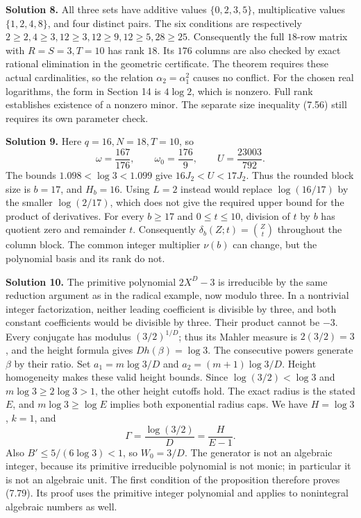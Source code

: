 \documentclass[
  11pt,
  a4paper,
]{article}
\begin{document}
\textbf{Solution 8.} All three sets have additive values
\(\{0,2,3,5\}\), multiplicative values \(\{1,2,4,8\}\), and four
distinct pairs. The six conditions are respectively
\(2\ge2,4\ge3,12\ge3,12\ge9,12\ge5,28\ge25\). Consequently the full
\(18\)-row matrix with \(R=S=3,T=10\) has rank \(18\). Its \(176\)
columns are also checked by exact rational elimination in the geometric
certificate. The theorem requires these actual cardinalities, so the
relation \(\alpha_2=\alpha_1^2\) causes no conflict. For the chosen real
logarithms, the form in Section 14 is \(4\log2\), which is nonzero. Full
rank establishes existence of a nonzero minor. The separate size
inequality (7.56) still requires its own parameter check.

\textbf{Solution 9.} Here \(q=16,N=18,T=10\), so \[
\omega=\frac{167}{176},\qquad
\omega_0=\frac{176}{9},\qquad
U=\frac{23003}{792}.
\] The bounds \(1.098<\log3<1.099\) give \(16J_2<U<17J_2\). Thus the
rounded block size is \(b=17\), and \(H_b=16\). Using \(L=2\) instead
would replace \(\log(16/17)\) by the smaller \(\log(2/17)\), which does
not give the required upper bound for the product of derivatives. For
every \(b\ge17\) and \(0\le t\le10\), division of \(t\) by \(b\) has
quotient zero and remainder \(t\). Consequently
\(\delta_b(Z;t)=\binom Zt\) throughout the column block. The common
integer multiplier \(\nu(b)\) can change, but the polynomial basis and
its rank do not.

\textbf{Solution 10.} The primitive polynomial \(2X^D-3\) is irreducible
by the same reduction argument as in the radical example, now modulo
three. In a nontrivial integer factorization, neither leading
coefficient is divisible by three, and both constant coefficients would
be divisible by three. Their product cannot be \(-3\). Every conjugate
has modulus \((3/2)^{1/D}\); thus its Mahler measure is \(2(3/2)=3\),
and the height formula gives \(Dh(\beta)=\log3\). The consecutive powers
generate \(\beta\) by their ratio. Set \(a_1=m\log3/D\) and
\(a_2=(m+1)\log3/D\). Height homogeneity makes these valid height
bounds. Since \(\log(3/2)<\log3\) and \(m\log3\ge2\log3>1\), the other
height cutoffs hold. The exact radius is the stated \(E\), and
\(m\log3\ge\log E\) implies both exponential radius caps. We have
\(H=\log3\), \(k=1\), and \[
\Gamma=\frac{\log(3/2)}D=\frac{H}{E-1}.
\] Also \(B'\le5/(6\log3)<1\), so \(W_0=3/D\). The generator is not an
algebraic integer, because its primitive irreducible polynomial is not
monic; in particular it is not an algebraic unit. The first condition of
the proposition therefore proves (7.79). Its proof uses the primitive
integer polynomial and applies to nonintegral algebraic numbers as well.
\end{document}
